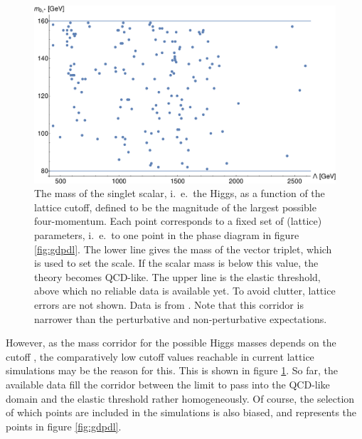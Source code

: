 \documentclass[final,twoside,12pt]{article}
\newcommand*{\1}{1\!\!\!\bot}
\begin{document}
\begin{figure}[hbtp!]
\begin{minipage}{0.6\linewidth}
\includegraphics[width=\linewidth]{hml}
\end{minipage}
\begin{minipage}{0.4\linewidth}
 \caption{\label{fig:hml}The mass of the singlet scalar, i.\ e.\ the Higgs, as a function of the lattice cutoff, defined to be the magnitude of the largest possible four-momentum. Each point corresponds to a fixed set of (lattice) parameters, i.\ e.\ to one point in the phase diagram in figure \ref{fig:gdpdl}. The lower line gives the mass of the vector triplet, which is used to set the scale. If the scalar mass is below this value, the theory becomes QCD-like. The upper line is the elastic threshold, above which no reliable data is available yet. To avoid clutter, lattice errors are not shown. Data is from \cite{Maas:unpublished,Maas:2014pba,Torek:2016ede}. Note that this corridor is narrower than the perturbative \cite{Altarelli:1994rb,Djouadi:2009nu} and non-perturbative \cite{Eichhorn:2015kea,Gies:2017ajd,Gies:2017zwf} expectations.}
\end{minipage}
\end{figure}

However, as the mass corridor for the possible Higgs masses depends on the cutoff \cite{Altarelli:1994rb,Callaway:1988ya,Bohm:2001yx,Djouadi:2009nu,Eichhorn:2015kea,Gies:2017ajd,Gies:2017zwf}, the comparatively low cutoff values reachable in current lattice simulations may be the reason for this. This is shown in figure \ref{fig:hml}. So far, the available data fill the corridor between the limit to pass into the QCD-like domain and the elastic threshold rather homogeneously. Of course, the selection of which points are included in the simulations is also biased, and represents the points in figure \ref{fig:gdpdl}.
\end{document}
